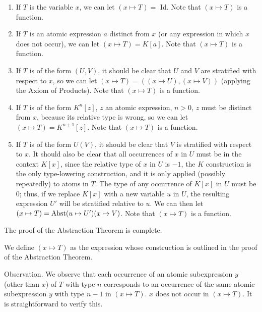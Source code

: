 \begin{enumerate}
 \item If $T$ is the variable $x$, we can let $(x \mapsto T) =$ Id.
   Note that $(x \mapsto T)$ is a function.
 \item If $T$ is an atomic expression $a$ distinct from $x$ (or any expression
   in which $x$ does not occur), we can let $(x \mapsto T) =  K[a]$.  Note
   that $(x \mapsto T)$ is a function.
 \item If $T$ is of the form $(U,V)$, it should be clear that $U$ and
   $V$ are stratified with respect to $x$, so we can let
   $(x \mapsto T) = ((x \mapsto U),(x \mapsto V))$ (applying the Axiom of
   Products).  Note that $(x \mapsto T)$ is a function.
 \item If $T$ is of the form $K^n[z]$, $z$ an atomic expression, $n>0$, $z$
   must be distinct from $x$, because its relative type is wrong, so we can let $(x \mapsto T) =
   K^{n+1}[z]$.  Note that $(x \mapsto T)$ is a function.
 \item If $T$ is of the form $U(V)$, it should be clear that $V$ is
   stratified with respect to $x$.  It should also be
   clear that all occurrences of $x$ in $U$ must be in the context $K[x]$,
   since the relative type of $x$ in $U$ is $-1$, the
   $K$
   construction is the only type-lowering
   construction, and it is only applied (possibly repeatedly) to atoms in $T$.
   The type of any occurrence of $K[x]$ in 
   $U$ must be 0; thus, if we replace $K[x]$ with a new variable $u$ in
   $U$, the resulting expression $U'$ will be stratified relative to $u$.  We
   can then let $(x \mapsto T) =  \mathop{\mathrm{Abst}}(u \mapsto U')(x \mapsto V)$.
   Note that $(x \mapsto T)$ is a function.
\end{enumerate}

The proof of the Abstraction Theorem is complete.
\finpreuve

\begin{definition}
 We define $(x \mapsto T)$ as the expression whose
 construction is outlined in the proof of the Abstraction Theorem.
\end{definition}

\begin{ThmEtc}{Observation.}
 We observe that each occurrence of an atomic
 subexpression $y$ (other than $x$) of $T$ with type
 $n$ corresponds to an occurrence of the same atomic subexpression $y$ with
 type $n-1$ in $(x \mapsto T)$.  $x$ does not occur in $(x \mapsto T)$.  It is 
 straightforward to verify this.
\end{ThmEtc}

